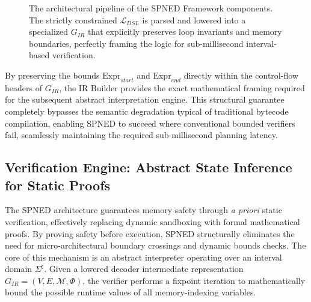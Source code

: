 \documentclass[onecolumn]{IEEEtran}
\numberwithin{equation}{section}
\theoremstyle{definition}
\theoremstyle{remark}
\begin{document}
\begin{figure}[htbp]
\centering
{}
\caption{The architectural pipeline of the SPNED Framework components. The strictly constrained $\mathcal{L}_{DSL}$ is parsed and lowered into a specialized $G_{IR}$ that explicitly preserves loop invariants and memory boundaries, perfectly framing the logic for sub-millisecond interval-based verification.}
\label{fig:spned_components}
\end{figure}

By preserving the bounds $\text{Expr}_{start}$ and $\text{Expr}_{end}$ directly within the control-flow headers of $G_{IR}$, the IR Builder provides the exact mathematical framing required for the subsequent abstract interpretation engine. This structural guarantee completely bypasses the semantic degradation typical of traditional bytecode compilation, enabling SPNED to succeed where conventional bounded verifiers fail, seamlessly maintaining the required sub-millisecond planning latency.

\subsection{Verification Engine: Abstract State Inference for Static Proofs}

The SPNED architecture guarantees memory safety through \textit{a priori} static verification, effectively replacing dynamic sandboxing \cite{gienieczko2025anyblox, watt2018mechanising} with formal mathematical proofs. By proving safety before execution, SPNED structurally eliminates the need for micro-architectural boundary crossings and dynamic bounds checks. The core of this mechanism is an abstract interpreter operating over an interval domain $\Sigma^\sharp$. Given a lowered decoder intermediate representation $G_{IR} = (V, E, \mathcal{M}, \Phi)$, the verifier performs a fixpoint iteration to mathematically bound the possible runtime values of all memory-indexing variables.
\end{document}
